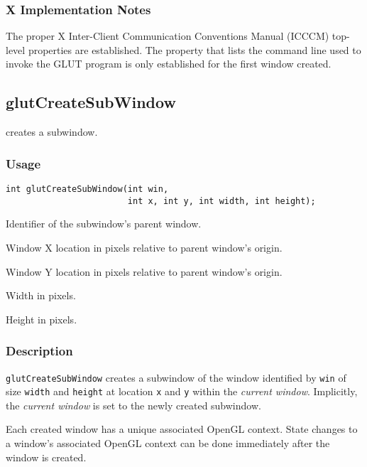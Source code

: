 \subsubsection*{X Implementation Notes}

The proper X Inter-Client Communication Conventions Manual
(ICCCM)
top-level properties are established.
The  property that lists the command line used to
invoke the GLUT program is only established for the first window created.

\subsection{glutCreateSubWindow}

 creates a subwindow.

\subsubsection*{Usage}
\begin{verbatim}
int glutCreateSubWindow(int win,
                        int x, int y, int width, int height);
\end{verbatim}
\begin{description}
\itemsep 0in
\item[{\tt win}]
Identifier of the subwindow's parent window.
\item[{\tt x}]
Window X location in pixels relative to parent window's origin.
\item[{\tt y}]
Window Y location in pixels relative to parent window's origin.
\item[{\tt width}]
Width in pixels.
\item[{\tt height}]
Height in pixels.
\end{description}

\subsubsection*{Description}

{\tt glutCreateSubWindow} creates a subwindow of the window identified by {\tt win}
of size {\tt width} and {\tt height} at location {\tt x} and {\tt y}
within the {\em current window}.
Implicitly, the {\em current window} is set to the newly created subwindow.

Each created window has a unique associated OpenGL context.  State changes to
a window's associated OpenGL context can be done immediately after the
window is created.

